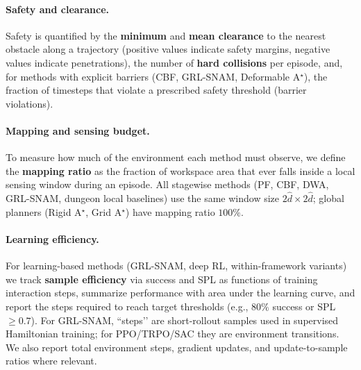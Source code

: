 \documentclass{article} %
\begin{document}
\paragraph{Safety and clearance.}
Safety is quantified by the \textbf{minimum} and \textbf{mean clearance} to the nearest obstacle along a trajectory (positive values indicate safety margins, negative values indicate penetrations), the number of \textbf{hard collisions} per episode, and, for methods with explicit barriers (CBF, GRL-SNAM, Deformable A$^{\star}$), the fraction of timesteps that violate a prescribed safety threshold (barrier violations).

\paragraph{Mapping and sensing budget.}
To measure how much of the environment each method must observe, we define the \textbf{mapping ratio} as the fraction of workspace area that ever falls inside a local sensing window during an episode. All stagewise methods (PF, CBF, DWA, GRL-SNAM, dungeon local baselines) use the same window size $2\hat d \times 2\hat d$; global planners (Rigid A$^{\star}$, Grid A$^{\star}$) have mapping ratio $100\%$.

\paragraph{Learning efficiency.}
For learning-based methods (GRL-SNAM, deep RL, within-framework variants) we track \textbf{sample efficiency} via success and SPL as functions of training interaction steps, summarize performance with area under the learning curve, and report the steps required to reach target thresholds (e.g., $80\%$ success or SPL $\geq 0.7$). For GRL-SNAM, “steps’’ are short-rollout samples used in supervised Hamiltonian training; for PPO/TRPO/SAC they are environment transitions. We also report total environment steps, gradient updates, and update-to-sample ratios where relevant.
\end{document}
